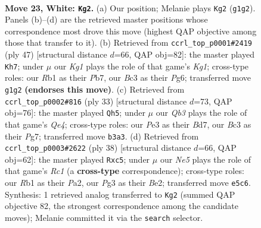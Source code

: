\documentclass[11pt]{article}
\begin{document}
\clearpage

\begin{figure}[p]\centering
\begin{subfigure}{0.46\textwidth}\centering
\resizebox{\linewidth}{!}{%
\newchessgame
\chessboard[
  setfen={rnb1q1k1/1p5p/4r1p1/p3Np2/8/1QB1P1P1/P4P1P/1R2R1K1 w - - 0 23},
  showmover=false,
  pgfstyle=straightmove, color=movearrow, markmove={g1-g2}
]}
\caption{}
\end{subfigure}\hfill
\begin{subfigure}{0.46\textwidth}\centering
\resizebox{\linewidth}{!}{%
\newchessgame
\chessboard[
  setfen={r4rk1/pp3p2/1q4pp/5n2/2b2P2/1PQ4P/PB3RP1/3R2K1 b - - 1 24},
  showmover=false,
  pgfstyle=straightmove, color=movearrow, markmove={g8-h7}
]}
\caption{}
\end{subfigure}
\\[4pt]
\begin{subfigure}{0.46\textwidth}\centering
\resizebox{\linewidth}{!}{%
\newchessgame
\chessboard[
  setfen={4rr1k/pppb2pp/n2p4/3Pq3/4N3/6P1/PP1Q2BP/R3R1K1 b - - 0 17},
  showmover=false,
  pgfstyle=straightmove, color=movearrow, markmove={e5-h5}
]}
\caption{}
\end{subfigure}\hfill
\begin{subfigure}{0.46\textwidth}\centering
\resizebox{\linewidth}{!}{%
\newchessgame
\chessboard[
  setfen={r5k1/pb2qpp1/1p2p2p/2r5/3Nn3/Q3P2P/PP2BPP1/2RR2K1 w - - 3 20},
  showmover=false,
  pgfstyle=straightmove, color=movearrow, markmove={c1-c5}
]}
\caption{}
\end{subfigure}
\caption{\textbf{Move 23, White: \texttt{Kg2}.} (a) Our position; Melanie plays \texttt{Kg2} (\texttt{g1g2}). Panels (b)--(d) are the retrieved master positions whose correspondence most drove this move (highest QAP objective among those that transfer to it). (b) Retrieved from \texttt{ccrl\_top\_p0001\#2419} (ply 47) [structural distance $d$=66, QAP obj=82]: the master played \texttt{Kh7}; under $\mu$ our \emph{Kg1} plays the role of that game's \emph{Kg1}; cross-type roles: our \emph{R}b1 as their \emph{P}b7, our \emph{B}c3 as their \emph{P}g6; transferred move \texttt{g1g2} \textbf{(endorses this move)}. (c) Retrieved from \texttt{ccrl\_top\_p0002\#816} (ply 33) [structural distance $d$=73, QAP obj=76]: the master played \texttt{Qh5}; under $\mu$ our \emph{Qb3} plays the role of that game's \emph{Qe4}; cross-type roles: our \emph{P}e3 as their \emph{B}d7, our \emph{B}c3 as their \emph{P}g7; transferred move \texttt{b3a3}. (d) Retrieved from \texttt{ccrl\_top\_p0003\#2622} (ply 38) [structural distance $d$=66, QAP obj=62]: the master played \texttt{Rxc5}; under $\mu$ our \emph{Ne5} plays the role of that game's \emph{Rc1} (a \textbf{cross-type} correspondence); cross-type roles: our \emph{R}b1 as their \emph{P}a2, our \emph{P}g3 as their \emph{B}e2; transferred move \texttt{e5c6}. Synthesis: 1 retrieved analog transferred to \texttt{Kg2} (summed QAP objective 82, the strongest correspondence among the candidate moves); Melanie committed it via the \texttt{search} selector.}
\label{fig:thought-m44}
\end{figure}
\end{document}
